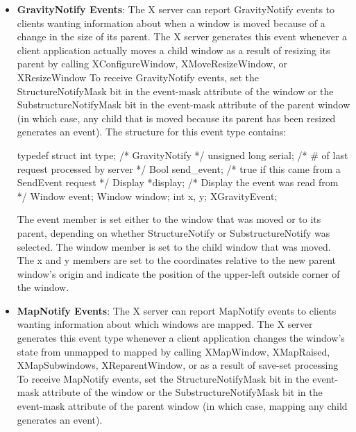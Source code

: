 \documentclass{report}
\begin{document}
\begin{itemize}
        \item \textbf{GravityNotify Events}: The X server can report GravityNotify events to clients wanting information about when a window is moved because of a change in the size of its parent. The X server generates this event whenever a client application actually moves a child window as a result of resizing its parent by calling XConfigureWindow, XMoveResizeWindow, or XResizeWindow
            \bigbreak \noindent 
            To receive GravityNotify events, set the StructureNotifyMask bit in the event-mask attribute of the window or the SubstructureNotifyMask bit in the event-mask attribute of the parent window (in which case, any child that is moved because its parent has been resized generates an event).
            \bigbreak \noindent 
            The structure for this event type contains:
            \bigbreak \noindent 
            \begin{cppcode}
                typedef struct {
                    int type;               /* GravityNotify */
                    unsigned long serial;   /* # of last request processed by server */
                    Bool send_event;        /* true if this came from a SendEvent request */
                    Display *display;       /* Display the event was read from */
                    Window event;
                    Window window;
                    int x, y;
                } XGravityEvent;
            \end{cppcode}
            \bigbreak \noindent 
            The event member is set either to the window that was moved or to its parent, depending on whether StructureNotify or SubstructureNotify was selected. The window member is set to the child window that was moved. The x and y members are set to the coordinates relative to the new parent window’s origin and indicate the position of the upper-left outside corner of the window.
        \item \textbf{MapNotify Events}: The X server can report MapNotify events to clients wanting information about which windows are mapped. The X server generates this event type whenever a client application changes the window’s state from unmapped to mapped by calling XMapWindow, XMapRaised, XMapSubwindows, XReparentWindow, or as a result of save-set processing
            \bigbreak \noindent 
            To receive MapNotify events, set the StructureNotifyMask bit in the event-mask attribute of the window or the SubstructureNotifyMask bit in the event-mask attribute of the parent window (in which case, mapping any child generates an event).

\end{itemize}
\end{document}
